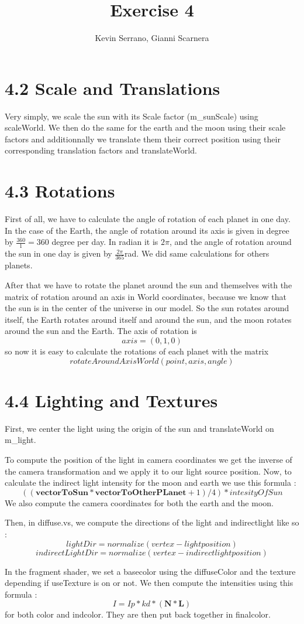\documentclass[10pt,a4paper]{report}
\author{Kevin Serrano, Gianni Scarnera}
\title{Exercise 4}
\begin{document}
\maketitle

\section*{4.2   Scale and Translations}
Very simply, we scale the sun with its Scale factor (m\_sunScale) using scaleWorld. We then do the same for the earth and the moon using their scale factors and additionnally we translate them their correct position using their corresponding translation factors and translateWorld.

\section*{4.3   Rotations}
First of all, we have to calculate the angle of rotation of each planet in one day. In the case of the Earth, the angle of rotation around its axis is given in degree by $\frac{360}{1} = 360$ degree per day. In radian it is $2 \pi$, and the angle of rotation around the sun in one day is given by $\frac{2 \pi}{365} $rad. We did same calculations for others planets.

After that we have to rotate the planet around the sun and themselves with the matrix of rotation around an axis in World coordinates, because we know that the sun is in the center of the universe in our model. So the sun rotates around itself, the Earth rotates around itself and around the sun, and the moon rotates around the sun and the Earth. The axis of rotation is $$axis = (0,1,0)$$ so now it is easy to calculate the rotations of each planet with the matrix $$rotateAroundAxisWorld(point,axis,angle)$$

\section*{4.4   Lighting and Textures}
First, we center the light using the origin of the sun and translateWorld on m\_light.

To compute the position of the light in camera coordinates we get the inverse of the camera transformation and we apply it to our light source position. Now, to calculate the indirect light intensity for the moon and earth we use this formula : $$((\mathbf{vectorToSun} * \mathbf{vectorToOtherPLanet} + 1)/4)*intesityOfSun$$
We also compute the camera coordinates for both the earth and the moon.

Then, in diffuse.vs, we compute the directions of the light and indirectlight like so :
$$lightDir = normalize(vertex - lightposition)$$
$$indirectLightDir = normalize(vertex - indirectlightposition)$$

In the fragment shader, we set a basecolor using the diffuseColor and the texture depending if useTexture is on or not. We then compute the intensities using this formula : $$I = Ip * kd * (\mathbf{N} * \mathbf{L})$$
for both color and indcolor. They are then put back together in finalcolor.
\end{document}

